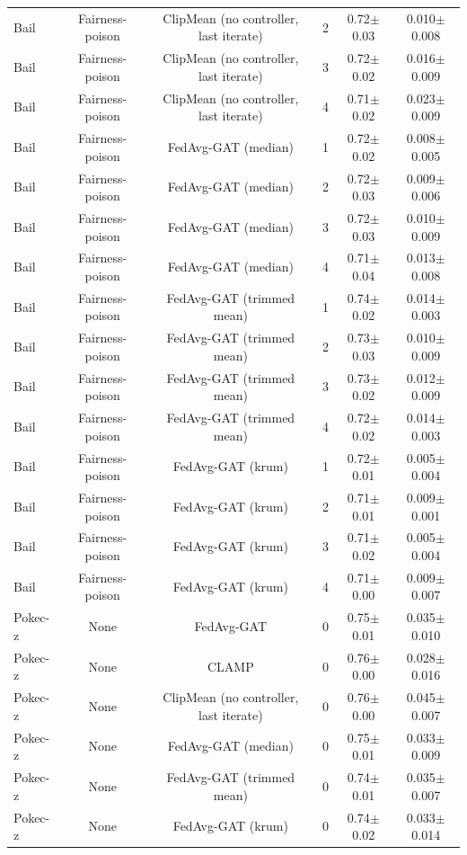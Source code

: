 \begin{table}[tbp]
\begin{tabular}{lccccc}
Bail & Fairness-poison & ClipMean (no controller, last iterate) & 2 & 0.72$\pm$0.03 & 0.010$\pm$0.008 \\
Bail & Fairness-poison & ClipMean (no controller, last iterate) & 3 & 0.72$\pm$0.02 & 0.016$\pm$0.009 \\
Bail & Fairness-poison & ClipMean (no controller, last iterate) & 4 & 0.71$\pm$0.02 & 0.023$\pm$0.009 \\
Bail & Fairness-poison & FedAvg-GAT (median) & 1 & 0.72$\pm$0.02 & 0.008$\pm$0.005 \\
Bail & Fairness-poison & FedAvg-GAT (median) & 2 & 0.72$\pm$0.03 & 0.009$\pm$0.006 \\
Bail & Fairness-poison & FedAvg-GAT (median) & 3 & 0.72$\pm$0.03 & 0.010$\pm$0.009 \\
Bail & Fairness-poison & FedAvg-GAT (median) & 4 & 0.71$\pm$0.04 & 0.013$\pm$0.008 \\
Bail & Fairness-poison & FedAvg-GAT (trimmed mean) & 1 & 0.74$\pm$0.02 & 0.014$\pm$0.003 \\
Bail & Fairness-poison & FedAvg-GAT (trimmed mean) & 2 & 0.73$\pm$0.03 & 0.010$\pm$0.009 \\
Bail & Fairness-poison & FedAvg-GAT (trimmed mean) & 3 & 0.73$\pm$0.02 & 0.012$\pm$0.009 \\
Bail & Fairness-poison & FedAvg-GAT (trimmed mean) & 4 & 0.72$\pm$0.02 & 0.014$\pm$0.003 \\
Bail & Fairness-poison & FedAvg-GAT (krum) & 1 & 0.72$\pm$0.01 & 0.005$\pm$0.004 \\
Bail & Fairness-poison & FedAvg-GAT (krum) & 2 & 0.71$\pm$0.01 & 0.009$\pm$0.001 \\
Bail & Fairness-poison & FedAvg-GAT (krum) & 3 & 0.71$\pm$0.02 & 0.005$\pm$0.004 \\
Bail & Fairness-poison & FedAvg-GAT (krum) & 4 & 0.71$\pm$0.00 & 0.009$\pm$0.007 \\
Pokec-z & None & FedAvg-GAT & 0 & 0.75$\pm$0.01 & 0.035$\pm$0.010 \\
Pokec-z & None & CLAMP & 0 & 0.76$\pm$0.00 & 0.028$\pm$0.016 \\
Pokec-z & None & ClipMean (no controller, last iterate) & 0 & 0.76$\pm$0.00 & 0.045$\pm$0.007 \\
Pokec-z & None & FedAvg-GAT (median) & 0 & 0.75$\pm$0.01 & 0.033$\pm$0.009 \\
Pokec-z & None & FedAvg-GAT (trimmed mean) & 0 & 0.74$\pm$0.01 & 0.035$\pm$0.007 \\
Pokec-z & None & FedAvg-GAT (krum) & 0 & 0.74$\pm$0.02 & 0.033$\pm$0.014 \\

\end{tabular}
\end{table}

